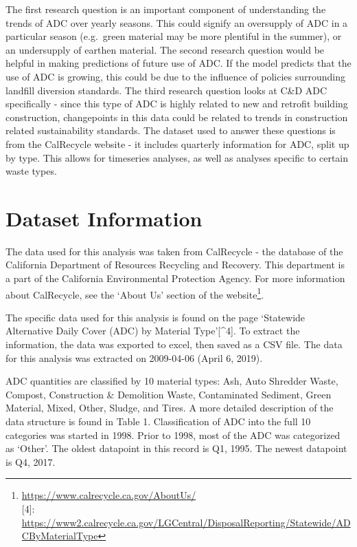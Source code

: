 \documentclass[12pt,]{article}
\let\rmarkdownfootnote\footnote%
\def\footnote{\protect\rmarkdownfootnote}
\begin{document}
The first research question is an important component of understanding
the trends of ADC over yearly seasons. This could signify an oversupply
of ADC in a particular season (e.g.~green material may be more plentiful
in the summer), or an undersupply of earthen material. The second
research question would be helpful in making predictions of future use
of ADC. If the model predicts that the use of ADC is growing, this could
be due to the influence of policies surrounding landfill diversion
standards. The third research question looks at C\&D ADC specifically -
since this type of ADC is highly related to new and retrofit building
construction, changepoints in this data could be related to trends in
construction related sustainability standards. The dataset used to
answer these questions is from the CalRecycle website - it includes
quarterly information for ADC, split up by type. This allows for
timeseries analyses, as well as analyses specific to certain waste
types.

\newpage

\section{Dataset Information}\label{dataset-information}

The data used for this analysis was taken from CalRecycle - the database
of the California Department of Resources Recycling and Recovery. This
department is a part of the California Environmental Protection Agency.
For more information about CalRecycle, see the `About Us' section of the
website\footnote{\url{https://www.calrecycle.ca.gov/AboutUs/}\\
  {[}4{]}:
  \url{https://www2.calrecycle.ca.gov/LGCentral/DisposalReporting/Statewide/ADCByMaterialType}}.

The specific data used for this analysis is found on the page `Statewide
Alternative Daily Cover (ADC) by Material Type'{[}\^{}4{]}. To extract
the information, the data was exported to excel, then saved as a CSV
file. The data for this analysis was extracted on 2009-04-06 (April 6,
2019).

ADC quantities are classified by 10 material types: Ash, Auto Shredder
Waste, Compost, Construction \& Demolition Waste, Contaminated Sediment,
Green Material, Mixed, Other, Sludge, and Tires. A more detailed
description of the data structure is found in Table 1. Classification of
ADC into the full 10 categories was started in 1998. Prior to 1998, most
of the ADC was categorized as `Other'. The oldest datapoint in this
record is Q1, 1995. The newest datapoint is Q4, 2017.
\end{document}
